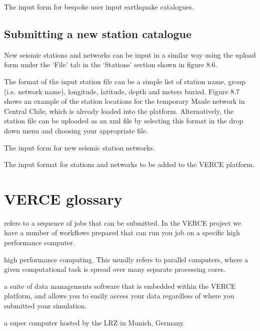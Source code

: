 \documentclass[english]{book}
\begin{document}

 The input form for bespoke user input earthquake
catalogues.


\section{Submitting a new station catalogue}
\label{\detokenize{Section8:submitting-a-new-station-catalogue}}
New seismic stations and networks can be input in a similar way using
the upload form under the ‘File’ tab in the ‘Stations’ section shown in
figure 8.6.

The format of the input station file can be a simple list of station
name, group (i.e. network name), longitude, latitude, depth and meters
buried. Figure 8.7 shows an example of the station locations for the
temporary Maule network in Central Chile, which is already loaded into
the platform. Alternatively, the station file can be uploaded as an xml
file by selecting this format in the drop down menu and choosing your
appropriate file.


 The input form for new seismic station networks.


 The input format for stations and networks to be added
to the VERCE platform.


\chapter{VERCE glossary}
\label{\detokenize{Glossary::doc}}\label{\detokenize{Glossary:verce-glossary}}
 \textendash{} refers to a sequence of jobs that can be submitted. In
the VERCE project we have a number of workflows prepared that can run
you job on a specific high performance computer.

 \textendash{} high performance computing. This usually refers to parallel
computers, where a given computational task is spread over many separate
processing cores.

 \textendash{} a suite of data managements software that is embedded within
the VERCE platform, and allows you to easily access your data regardless
of where you submitted your simulation.

 \textendash{} a super computer hosted by the LRZ in Munich, Germany.
\end{document}
